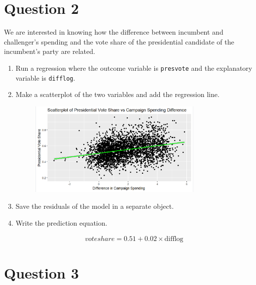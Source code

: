 \documentclass[12pt,letterpaper]{article}
\begin{document}
\section*{Question 2}
\noindent We are interested in knowing how the difference between incumbent and challenger's spending and the vote share of the presidential candidate of the incumbent's party are  related.	\vspace{.25cm}
	\begin{enumerate}
		\item Run a regression where the outcome variable is \texttt{presvote} and the explanatory variable is \texttt{difflog}.		
		\item Make a scatterplot of the two variables and add the regression line. 		
		\begin{figure}[h]
			\centering
			\includegraphics[width=0.8\textwidth]{Question2.png}
     	\end{figure}	
			\vspace{5cm}
		\item Save the residuals of the model in a separate object.		
		\item Write the prediction equation.
			
				\begin{align*}
				voteshare = 0.51 + 0.02 \times \text{difflog}
			\end{align*}
	\end{enumerate}
	
\section*{Question 3}
\end{document}
